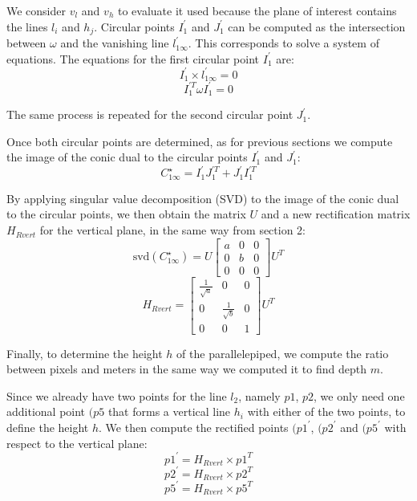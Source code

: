 \documentclass{Configuration_Files/PoliMi3i_thesis}
\begin{document}
\noindent
We consider \(v_{l}\) and \(v_{h}\) to evaluate it used because the plane of interest contains the lines \(l_{i}\) and \(h_{j}\). Circular points \(I^{\prime}_{1}\) and \(J^{\prime}_{1}\) can be computed as the intersection between \(\omega\) and the vanishing line \(l^{\prime}_{1\infty}\). This corresponds to solve a system of equations.
The equations for the first circular point \(I^{\prime}_{1}\) are:
\[
I^{\prime}_{1} \times l^{\prime}_{1\infty} = 0  
\]
\[
I^{\prime T}_{1} \omega I^{\prime}_{1} = 0  
\]

\noindent
The same process is repeated for the second circular point \(J^{\prime}_{1}\).

\noindent
Once both circular points are determined, as for previous sections we compute the image of the conic dual to the circular points \(I^{\prime}_{1}\) and \(J^{\prime}_{1}\):
\[
C^{\star}_{1\infty} = I^{\prime}_{1} J^{\prime T}_{1} + J^{\prime}_{1} I^{\prime T}_{1}  
\]

\noindent
By applying singular value decomposition (SVD) to the image of the conic dual to the circular points, we then obtain the matrix \(U\) and a new rectification matrix $H_{Rvert}$ for the vertical plane, in the same way from section 2:
\[
\text{svd}(C^{\star}_{1\infty}) = U \begin{bmatrix} a & 0 & 0 \\ 0 & b & 0 \\ 0 & 0 & 0 \end{bmatrix} U^{T}  
\]
\[
H_{Rvert} = \begin{bmatrix} \frac{1}{\sqrt{a}} & 0 & 0 \\ 0 & \frac{1}{\sqrt{b}} & 0 \\ 0 & 0 & 1 \end{bmatrix} U^{T}  
\]

\noindent
Finally, to determine the height \(h\) of the parallelepiped, we compute the ratio between pixels and meters in the same way we computed it to find depth $m$.

\noindent
Since we already have two points for the line \(l_{2}\), namely \(p1\), \(p2\), we only need one additional point \((p5\) that forms a vertical line \(h_{i}\) with either of the two points, to define the height \(h\). We then compute the rectified points \((p1^{\prime}\), \((p2^{\prime}\) and \((p5^{\prime}\) with respect to the vertical plane:
\[
p1^{\prime} = H_{Rvert} \times p1^{T} 
\]
\[
p2^{\prime} = H_{Rvert} \times p2^{T} 
\]
\[
p5^{\prime} = H_{Rvert} \times p5^{T} 
\]
\end{document}

